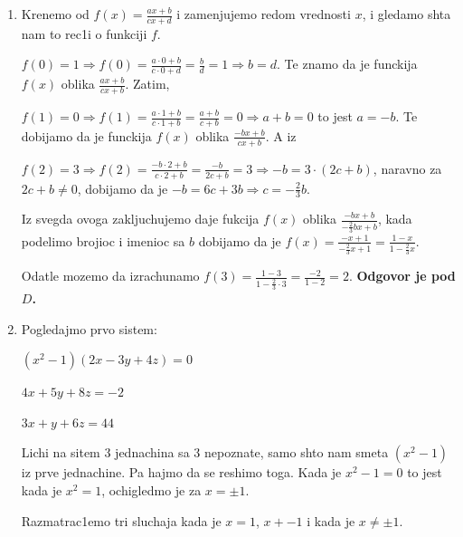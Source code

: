 \documentclass[a4paper,12pt]{article}
\begin{document}
\begin{enumerate}[1.]
\item Krenemo od $f(x) = \frac{ax +b}{cx+d} $ i zamenjujemo redom vrednosti $x$, i gledamo shta nam to rec1i o funkciji $f$.
\par $f(0) = 1 \Longrightarrow f(0) = \frac{a \cdot 0 + b}{c \cdot 0 + d} = \frac{b}{d} = 1  \Longrightarrow  b = d$. Te znamo da je funckija $f(x)$ oblika $\frac{ax+b}{cx+b}$. Zatim,
\par $f(1) = 0 \Longrightarrow f(1) = \frac{a \cdot 1 + b}{c \cdot 1 + b} = \frac{a+b}{c+b} = 0  \Longrightarrow  a+b = 0$ to jest $a = -b$. Te dobijamo da je funckija $f(x)$ oblika $\frac{-bx+b}{cx+b}$. A iz
\par $f(2) = 3 \Longrightarrow f(2) = \frac{-b \cdot 2 + b}{c \cdot 2 + b} = \frac{-b}{2c+b} = 3  \Longrightarrow  -b = 3 \cdot (2c+b)$, naravno za $2c+b \neq 0$, dobijamo da je $-b = 6c +3b \Longrightarrow c = - \frac{2}{3} b$.
\par Iz svegda ovoga zakljuchujemo daje fukcija $f(x)$ oblika $\frac{-bx + b}{- \frac{2}{3} b x + b} $, kada podelimo brojioc i imenioc sa $b$ dobijamo da je $f(x) =\frac{-x + 1}{- \frac{2}{3} x + 1} =\frac{1-x}{1- \frac{2}{3} x }  $.
\par Odatle mozemo da izrachunamo $f(3) =\frac{1-3}{1- \frac{2}{3} \cdot 3 } = \frac{-2}{1-2} = 2 $. \textbf{Odgovor je pod $D$.}


\item Pogledajmo prvo sistem:
\begin{center}
\par $(x^{2} - 1)(2x -3y + 4z) = 0$
\par $4x + 5y +8z = -2$
\par $3x + y + 6z = 44$
\end{center}

\par Lichi na sitem 3 jednachina sa 3 nepoznate, samo shto nam smeta $(x^{2} - 1)$  iz prve jednachine. Pa hajmo da se reshimo toga. Kada je $x^{2} - 1 = 0$ to jest kada je $x^{2} =1$, ochigledmo je za $x = \pm 1$.
\par Razmatrac1emo tri sluchaja kada je $x = 1$, $x+ -1$ i kada je $x \neq \pm 1$.
\begin{enumerate}[1)]


\end{enumerate}
\end{enumerate}
\end{document}

